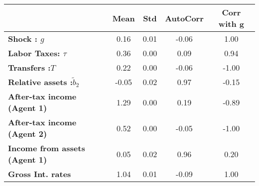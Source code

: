 \begin{tiny}\begin{tabular}{|l|c|c|c|c|}
\hline
&\textbf{Mean}&\textbf{Std}&\textbf{AutoCorr}&\textbf{Corr with g}\\\hline
\textbf{Shock : $g$}&0.16&0.01&-0.06&1.00\\\hline
\textbf{Labor Taxes: $\tau$}&0.36&0.00&0.09&0.94\\\hline
\textbf{Transfers :$T$}&0.22&0.00&-0.06&-1.00\\\hline
\textbf{Relative assets  :$\tilde{b}_2$}&-0.05&0.02&0.97&-0.15\\\hline
\textbf{After-tax income (Agent 1)}&1.29&0.00&0.19&-0.89\\\hline
\textbf{After-tax income (Agent 2)}&0.52&0.00&-0.05&-1.00\\\hline
\textbf{Income from assets (Agent 1)}&0.05&0.02&0.96&0.20\\\hline
\textbf{Gross Int. rates}&1.04&0.01&-0.09&1.00\\\hline
\end{tabular}
\end{tiny}